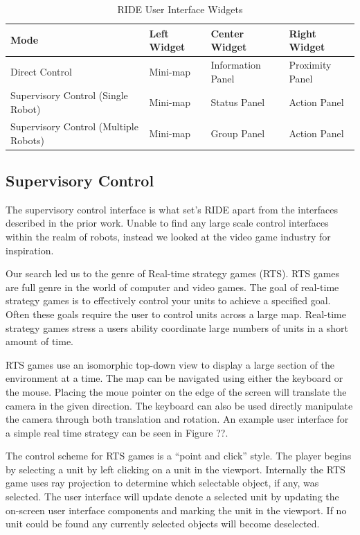 \begin{table}[ht]
\label{tab:ui-widgets}
\begin{center}
    \begin{tabular}{ | p{4cm} | l | l | l |}
    \hline
    \textbf{Mode} & \textbf{Left Widget} & \textbf{Center Widget} & \textbf{Right Widget} \\ \hline
    Direct Control & Mini-map & Information Panel & Proximity Panel \\ \hline
    Supervisory Control (Single Robot) & Mini-map & Status Panel & Action Panel \\ \hline
    Supervisory Control (Multiple Robots) & Mini-map & Group Panel & Action Panel \\ \hline
    \hline
    \end{tabular}
    \caption{RIDE User Interface Widgets}
\end{center}
\end{table}

\subsection{Supervisory Control}
\label{subs:ui-supervisor}

The supervisory control interface is what set's RIDE apart from the interfaces described in the prior work. Unable to find any large scale control interfaces within the realm of robots, instead we looked at the video game industry for inspiration.

Our search led us to the genre of Real-time strategy games (RTS). RTS games are full genre in the world of computer and video games. The goal of real-time strategy games is to effectively control your units to achieve a specified goal. Often these goals require the user to control units across a large  map. Real-time strategy games stress a users ability coordinate large numbers of units in a short amount of time. 

RTS games use an isomorphic top-down view to display a large section of the environment at a time. The map can be navigated using either the keyboard or the mouse. Placing the moue pointer on the edge of the screen will translate the camera in the given direction. The keyboard can also be used directly manipulate the camera through both translation and rotation. An example user interface for a simple real time strategy can be seen in Figure ??. 

The control scheme for RTS games is a ``point and click'' style. The player begins by selecting a unit by left clicking on a unit in the viewport. Internally the RTS game uses ray projection to determine which selectable object, if any, was selected. The user interface will update denote a selected unit by updating the on-screen user interface components and marking the unit in the viewport. If no unit could be found any currently selected objects will become deselected.

